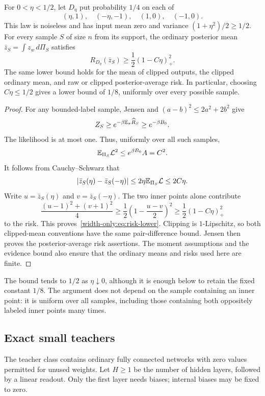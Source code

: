 \begin{theorem}
\label{width-only:thm:general}
For $0<\eta<1/2$, let $D_\eta$ put probability $1/4$ on each of
\[
 (\eta,1),\quad(-\eta,-1),\quad(1,0),\quad(-1,0).
\]
This law is noiseless and has input mean zero and variance $(1+\eta^2)/2\ge1/2$. For every sample $S$ of size $n$ from its support, the ordinary posterior mean $\bar z_S=\int z_w\,d\Pi_S$ satisfies
\begin{equation}
 R_{D_\eta}(\bar z_S)
 \ge\frac12(1-C\eta)_+^2.
 \label{width-only:eq:risk-lower}
\end{equation}
The same lower bound holds for the mean of clipped outputs, the clipped ordinary mean, and raw or clipped posterior-average risk. In particular, choosing $C\eta\le1/2$ gives a lower bound of $1/8$, uniformly over every possible sample.
\end{theorem}
\begin{proof}
For any bounded-label sample, Jensen and $(a-b)^2\le2a^2+2b^2$ give
\[
 Z_S\ge e^{-\beta\mathbb E_\pi\widehat R_S}\ge e^{-\beta B_0}.
\]
The likelihood is at most one. Thus, uniformly over all such samples,
\[
 \mathbb E_{\Pi_S}\mathcal L^2\le e^{\beta B_0}A=C^2.
\]
It follows from Cauchy--Schwarz that
\[
 |\bar z_S(\eta)-\bar z_S(-\eta)|
 \le2\eta\mathbb E_{\Pi_S}\mathcal L\le2C\eta.
\]
Write $u=\bar z_S(\eta)$ and $v=\bar z_S(-\eta)$. The two inner points alone contribute
\[
 \frac{(u-1)^2+(v+1)^2}{4}
 \ge\frac12\left(1-\frac{u-v}{2}\right)^2
 \ge\frac12(1-C\eta)_+^2
\]
to the risk. This proves~\eqref{width-only:eq:risk-lower}. Clipping is $1$-Lipschitz, so both clipped-mean conventions have the same pair-difference bound. Jensen then proves the posterior-average risk assertions. The moment assumptions and the evidence bound also ensure that the ordinary means and risks used here are finite.
\end{proof}

The bound tends to $1/2$ as $\eta\downarrow0$, although it is enough below to retain the fixed constant $1/8$. The argument does not depend on the sample containing an inner point: it is uniform over all samples, including those containing both oppositely labeled inner points many times.

\subsection{Exact small teachers}
The teacher class contains ordinary fully connected networks with zero values permitted for unused weights. Let $H\ge1$ be the number of hidden layers, followed by a linear readout. Only the first layer needs biases; internal biases may be fixed to zero.

